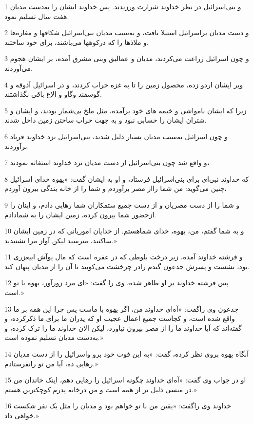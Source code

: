\par 1 و بنی‌اسرائیل در نظر خداوند شرارت ورزیدند. پس خداوند ایشان را به‌دست مدیان هفت سال تسلیم نمود.
\par 2 و دست مدیان براسرائیل استیلا یافت، و به‌سبب مدیان بنی‌اسرائیل شکافها و مغاره‌ها و ملاذها را که درکوهها می‌باشند، برای خود ساختند.
\par 3 و چون اسرائیل زراعت می‌کردند، مدیان و عمالیق وبنی مشرق آمده، بر ایشان هجوم می‌آوردند.
\par 4 وبر ایشان اردو زده، محصول زمین را تا به غزه خراب کردند، و در اسرائیل آذوقه و گوسفند وگاو و الاغ باقی نگذاشتند.
\par 5 زیرا که ایشان بامواشی و خیمه های خود برآمده، مثل ملخ بی‌شمار بودند، و ایشان و شتران ایشان را حسابی نبود و به جهت خراب ساختن زمین داخل شدند.
\par 6 و چون اسرائیل به‌سبب مدیان بسیار ذلیل شدند، بنی‌اسرائیل نزد خداوند فریاد برآوردند.
\par 7 و واقع شد چون بنی‌اسرائیل از دست مدیان نزد خداوند استغاثه نمودند،
\par 8 که خداوند نبی‌ای برای بنی‌اسرائیل فرستاد، و او به ایشان گفت: «یهوه خدای اسرائیل چنین می‌گوید: من شما رااز مصر برآوردم و شما را از خانه بندگی بیرون آوردم،
\par 9 و شما را از دست مصریان و از دست جمیع ستمکاران شما رهایی دادم، و اینان را ازحضور شما بیرون کرده، زمین ایشان را به شمادادم.
\par 10 و به شما گفتم، من، یهوه، خدای شماهستم. از خدایان اموریانی که در زمین ایشان ساکنید، مترسید لیکن آواز مرا نشنیدید.»
\par 11 و فرشته خداوند آمده، زیر درخت بلوطی که در عفره است که مال یوآش ابیعزری بود، نشست و پسرش جدعون گندم رادر چرخشت می‌کوبید تا آن را از مدیان پنهان کند.
\par 12 پس فرشته خداوند بر او ظاهر شده، وی را گفت: «ای مرد زورآور، یهوه با تو است.»
\par 13 جدعون وی راگفت: «آه‌ای خداوند من، اگر یهوه با ماست پس چرا این همه بر ما واقع شده است، و کجاست جمیع اعمال عجیب او که پدران ما برای ما ذکرکرده، و گفته‌اند که آیا خداوند ما را از مصر بیرون نیاورد، لیکن الان خداوند ما را ترک کرده، و به‌دست مدیان تسلیم نموده است.» 
\par 14 آنگاه یهوه بروی نظر کرده، گفت: «به این قوت خود برو واسرائیل را از دست مدیان رهایی ده، آیا من تو رانفرستادم.»
\par 15 او در جواب وی گفت: «آه‌ای خداوند چگونه اسرائیل را رهایی دهم، اینک خاندان من در منسی ذلیل تر از همه است و من درخانه پدرم کوچکترین هستم.»
\par 16 خداوند وی راگفت: «یقین من با تو خواهم بود و مدیان را مثل یک نفر شکست خواهی داد.»
